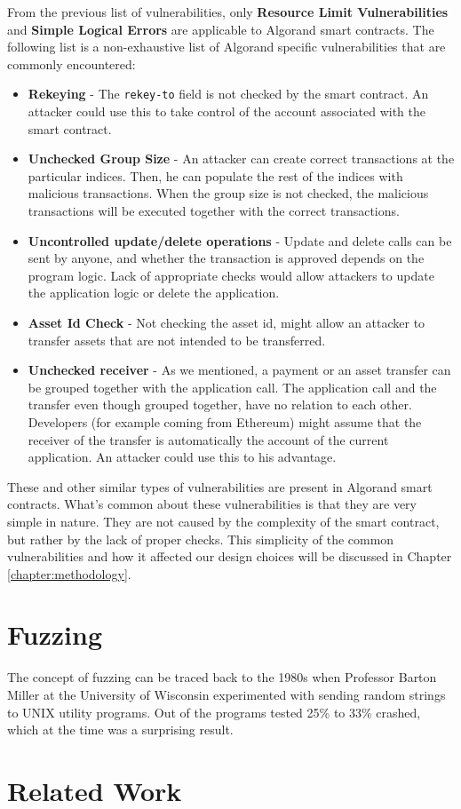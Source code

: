 From the previous list of vulnerabilities, only \textbf{Resource Limit Vulnerabilities} and \textbf{Simple Logical Errors} are applicable to Algorand smart contracts. The following list is a non-exhaustive list of Algorand specific vulnerabilities that are commonly encountered:
\begin{itemize}
    \item \textbf{Rekeying} - The \texttt{rekey-to} field is not checked by the smart contract. An attacker could use this to take control of the account associated with the smart contract.
    \item \textbf{Unchecked Group Size} - An attacker can create correct transactions at the particular indices. Then, he can populate the rest of the indices with malicious transactions. When the group size is not checked, the malicious transactions will be executed together with the correct transactions.
    \item \textbf{Uncontrolled update/delete operations} - Update and delete calls can be sent by anyone, and whether the transaction is approved depends on the program logic. Lack of appropriate checks would allow attackers to update the application logic or delete the application.
    \item \textbf{Asset Id Check} - Not checking the asset id, might allow an attacker to transfer assets that are not intended to be transferred.
    \item \textbf{Unchecked receiver} - As we mentioned, a payment or an asset transfer can be grouped together with the application call. The application call and the transfer even though grouped together, have no relation to each other. Developers (for example coming from Ethereum) might assume that the receiver of the transfer is automatically the account of the current application. An attacker could use this to his advantage.
\end{itemize}

These and other similar types of vulnerabilities are present in Algorand smart contracts.
What's common about these vulnerabilities is that they are very simple in nature.
They are not caused by the complexity of the smart contract, but rather by the lack of proper checks.
This simplicity of the common vulnerabilities and how it affected our design choices will be discussed in Chapter \ref{chapter:methodology}.

\section{Fuzzing} \label{section:fuzzing}
The concept of fuzzing can be traced back to the 1980s when Professor Barton Miller at the University of Wisconsin experimented with sending random strings to UNIX utility programs.
Out of the programs tested 25\% to 33\% crashed, which at the time was a surprising result.


\section{Related Work}

